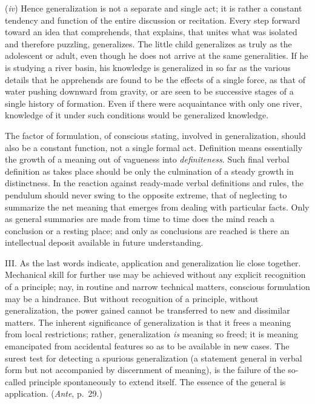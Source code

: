 \documentclass[showtrims,ustradepaper]{memoir}
\begin{document}
(\emph{iv}) Hence generalization is not a separate and single act; it is
rather a constant tendency and function of the entire discussion or
recitation. Every step forward toward an idea that comprehends, that
explains, that unites what was isolated and therefore puzzling,
generalizes. The little child generalizes as truly as the adolescent or
adult, even though he does not arrive at the same generalities. If he is
studying a river basin, his knowledge is generalized in so far as the
various details that he apprehends are found to be the effects of a
single force, as that of water pushing downward from gravity, or are
seen to be successive stages of a single history of formation. Even if
there were acquaintance with only one river, knowledge of it under such
conditions would be generalized
knowledge.


The factor of formulation, of conscious stating, involved in
generalization, should also be a constant function, not a single formal
act. Definition means essentially the growth of a meaning out of
vagueness into \emph{definiteness}. Such final verbal definition as
takes place should be only the culmination of a steady growth in
distinctness. In the reaction against ready-made verbal definitions and
rules, the pendulum should never swing to the opposite extreme, that of
neglecting to summarize the net meaning that emerges from dealing with
particular facts. Only as general summaries are made from time to time
does the mind reach a conclusion or a resting place; and only as
conclusions are reached is there an intellectual deposit available in
future understanding.


III. As the last words indicate, application and generalization lie
close together. Mechanical skill for further use may be achieved without
any explicit recognition of a principle; nay, in routine and narrow
technical matters, conscious formulation may be a hindrance. But without
recognition of a principle, without generalization, the power gained
cannot be transferred to new and dissimilar matters. The inherent
significance of generalization is that it frees a meaning from local
restrictions; rather, generalization \emph{is} meaning so freed; it is
meaning emancipated from accidental features so as to be available in
new cases. The surest test for detecting a spurious generalization (a
statement general in verbal form but not accompanied by discernment of
meaning), is the failure of the so-called principle spontaneously to
extend itself. The essence of the general is application. (\emph{Ante},
p.\ 29.)
\end{document}

